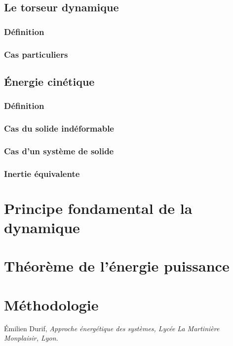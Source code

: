 \documentclass[10pt,fleqn]{article} %
\begin{document}
\subsection{Le torseur dynamique}
\subsubsection{Définition}
\subsubsection{Cas particuliers}

\subsection{Énergie cinétique}
\subsubsection{Définition}
\subsubsection{Cas du solide indéformable}
\subsubsection{Cas d'un système de solide}
\subsubsection{Inertie équivalente}

\section{Principe fondamental de la dynamique}

\section{Théorème de l'énergie puissance}

\section{Méthodologie}





\begin{thebibliography}{2}
    Émilien Durif, {\it Approche énergétique des systèmes, Lycée La Martinière Monplaisir, Lyon.}
\end{thebibliography}
\end{document}
